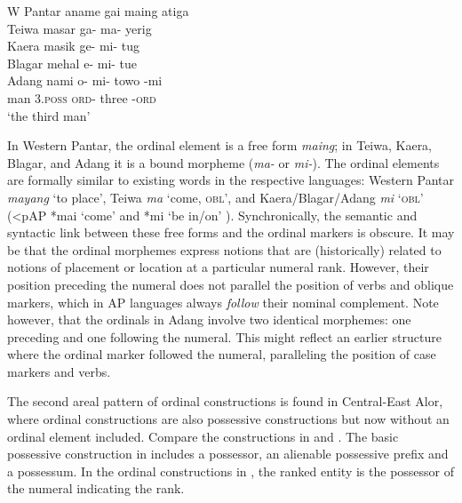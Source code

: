 \ea
\label{bkm:Ref342649632}
\gllllll
      {\upshape W Pantar}     aname  gai  maing  atiga \\  
      {\upshape Teiwa}          masar  ga-  ma-  yerig \\
      {\upshape Kaera}          masik  ge-  mi-  tug \\
      {\upshape Blagar}         mehal {\textglotstop}e-  mi-  tue  \\
      {\upshape Adang}          nami  {\textglotstop}o-  mi-  towo  {}-mi \\      
      { }            man \textsc{3.poss}  \textsc{ord-} three  -\textsc{ord} \\
\glt  `the third man'
\z

\let\eachwordone=\itshape
\let\eachwordtwo=\upshape
\let\eachwordthree=\upshape
\let\eachwordfour=\upshape
\let\eachwordfive=\upshape 

In Western Pantar, the ordinal element is a free form \textit{maing}; in Teiwa, Kaera, Blagar, and Adang it is a bound morpheme (\textit{ma-} or \textit{mi-}). The ordinal elements are formally similar to existing words in the respective languages: Western Pantar \textit{mayang} `to place', Teiwa \textit{ma} `come, \textsc{obl}', and Kaera/Blagar/Adang \textit{mi} `\textsc{obl' (}{\textless}pAP *mai `come' and *mi `be in/on' \citealt{HoltonRobinsonTVhistory}). Synchronically, the semantic and syntactic link between these free forms and the ordinal markers is obscure. It may be that the ordinal morphemes express notions that are (historically) related to notions of placement or location at a particular numeral rank. However, their position preceding the numeral does not parallel the position of verbs and oblique markers, which in AP languages always \textit{follow} their nominal complement. Note however, that the ordinals in Adang involve two identical morphemes: one preceding and one following the numeral. This might reflect an earlier structure where the ordinal marker followed the numeral, paralleling the position of case markers and verbs.

The second areal pattern of ordinal constructions is found in Central-East Alor, where ordinal constructions are also possessive constructions but now without an ordinal element included. Compare the constructions in  and . The basic possessive construction in  includes a possessor, an alienable possessive prefix and a possessum. In the ordinal constructions in , the ranked entity is the possessor of the numeral indicating the rank.


